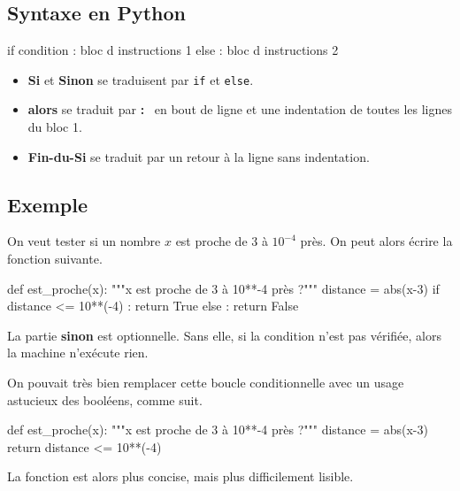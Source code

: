 

\subsection{Syntaxe en Python}

\begin{pyverbatim}
if condition : 
	bloc d instructions 1
else :
	bloc d instructions 2
\end{pyverbatim}


 \begin{itemize}
 \item \textbf{Si} et \textbf{Sinon} se traduisent par \texttt{if} et \texttt{else}. 
 
 \item \textbf{alors} se traduit par \og \textbf{:} \fg\ en bout de ligne et une indentation de toutes les 
lignes du bloc 1.
 
 \item \textbf{Fin-du-Si} se traduit par un retour à la ligne sans indentation. 
 
 \end{itemize}

 
\subsection{Exemple}

On veut tester si un nombre $x$ est proche de 3 à $10^{-4}$ près. On peut alors écrire la fonction suivante. 

\begin{pyverbatim}
def est_proche(x):
    """x est proche de 3 à 10**-4 près ?"""
    distance = abs(x-3)
    if distance <= 10**(-4) : 
        return True 
    else : 
        return False
\end{pyverbatim}



\begin{rem} 
La partie \textbf{sinon} est optionnelle. Sans elle, si la condition n'est pas vérifiée, alors la 
machine n'exécute rien.
\end{rem}

\begin{rem}
  On pouvait très bien remplacer cette boucle conditionnelle avec un usage astucieux des booléens, comme suit.
\begin{pyverbatim}
def est_proche(x):
    """x est proche de 3 à 10**-4 près ?"""
    distance = abs(x-3)
    return distance <= 10**(-4)
\end{pyverbatim}
La fonction est alors plus concise, mais plus difficilement lisible. 
\end{rem}


